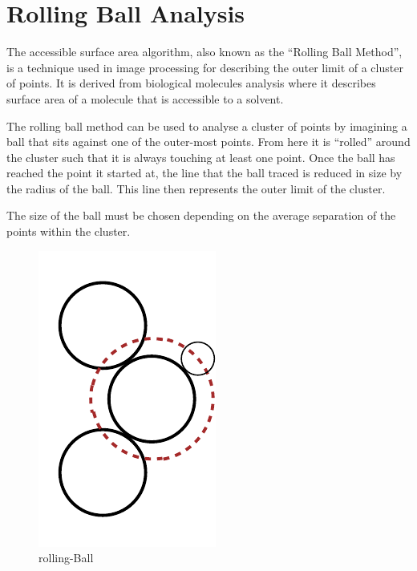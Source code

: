 
\section{Rolling Ball Analysis}
\label{sec:rolling_ball_analysis}

The accessible surface area algorithm, also known as the ``Rolling Ball
Method'', is a technique used in image processing for describing the outer
limit of a cluster of points. It is derived from biological molecules analysis
where it describes surface area of a molecule that is accessible to a solvent.

The rolling ball method can be used to analyse a cluster of points by imagining
a ball that sits against one of the outer-most points. From here it is
``rolled'' around the cluster such that it is always touching at least one
point. Once the ball has reached the point it started at, the line that the ball
traced is reduced in size by the radius of the ball. This line then represents
the outer limit of the cluster.

The size of the ball must be chosen depending on the average separation of the
points within the cluster.

\begin{figure}[tbhp]
	\centering
	\includegraphics[width=0.5\linewidth]{rolling-ball.pdf}
	\caption{rolling-Ball}
	\label{fig:rolling-ball}
\end{figure}
